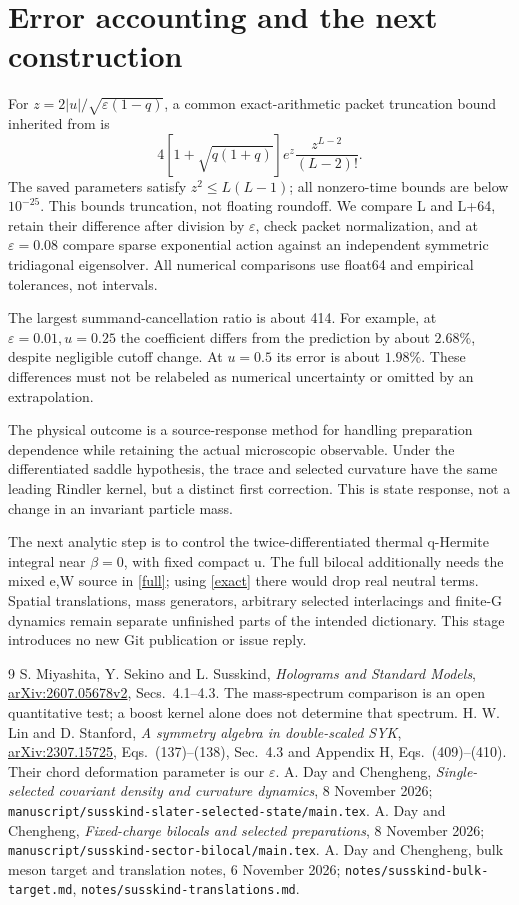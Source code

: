 \documentclass[11pt]{article}
\begin{document}
\section{Error accounting and the next construction}
For $z=2|u|/\sqrt{\varepsilon(1-q)}$, a common exact-arithmetic
packet truncation bound inherited from \cite{selected} is
\[
 4[1+\sqrt{q(1+q)}]e^z\frac{z^{L-2}}{(L-2)!}.
\]
The saved parameters satisfy $z^2\le L(L-1)$; all nonzero-time
bounds are below $10^{-25}$. This bounds truncation, not floating
roundoff. We compare L and L+64, retain their difference after
division by $\varepsilon$, check packet normalization, and at
$\varepsilon=0.08$ compare sparse exponential action against an
independent symmetric tridiagonal eigensolver. All numerical
comparisons use float64 and empirical tolerances, not intervals.

The largest summand-cancellation ratio is about 414. For example,
at $\varepsilon=0.01,u=0.25$ the coefficient differs from the
prediction by about $2.68\%$, despite negligible cutoff change.
At $u=0.5$ its error is about $1.98\%$. These differences must not
be relabeled as numerical uncertainty or omitted by an extrapolation.

The physical outcome is a source-response method for handling
preparation dependence while retaining the actual microscopic
observable. Under the differentiated saddle hypothesis, the
trace and selected curvature have the same leading Rindler
kernel, but a distinct first correction. This is state response,
not a change in an invariant particle mass.

The next analytic step is to control the twice-differentiated
thermal q-Hermite integral near $\beta=0$, with fixed compact u.
The full bilocal additionally needs the mixed e,W source in
\eqref{full}; using \eqref{exact} there would drop real neutral
terms. Spatial translations, mass generators, arbitrary selected
interlacings and finite-G dynamics remain separate unfinished
parts of the intended dictionary. This stage introduces no new
Git publication or issue reply.

\begin{thebibliography}{9}\small
{} S. Miyashita, Y. Sekino and L. Susskind,
\emph{Holograms and Standard Models},
\href{https://arxiv.org/html/2607.05678v2}{arXiv:2607.05678v2},
Secs.~4.1--4.3. The mass-spectrum comparison is an open quantitative
test; a boost kernel alone does not determine that spectrum.
 H. W. Lin and D. Stanford, \emph{A symmetry algebra
in double-scaled SYK},
\href{https://arxiv.org/html/2307.15725}{arXiv:2307.15725},
Eqs.~(137)--(138), Sec.~4.3 and Appendix H, Eqs.~(409)--(410).
Their chord deformation parameter is our $\varepsilon$.
 A. Day and Chengheng, \emph{Single-selected
covariant density and curvature dynamics}, 8 November 2026;
\texttt{manuscript/susskind-slater-selected-state/main.tex}.
 A. Day and Chengheng, \emph{Fixed-charge bilocals
and selected preparations}, 8 November 2026;
\texttt{manuscript/susskind-sector-bilocal/main.tex}.
 A. Day and Chengheng, bulk meson target and
translation notes, 6 November 2026;
\texttt{notes/susskind-bulk-target.md},
\texttt{notes/susskind-translations.md}.
\end{thebibliography}
\end{document}
